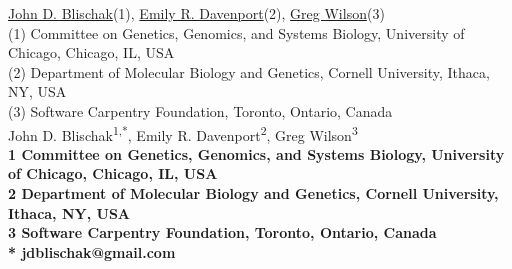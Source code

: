

\iflatexml
  \href{https://www.authorea.com/users/5990}{John D. Blischak}(1), \href{https://www.authorea.com/users/16152}{Emily R. Davenport}(2), \href{https://www.authorea.com/users/18131}{Greg Wilson}(3)\\

  (1) Committee on Genetics, Genomics, and Systems Biology, University of Chicago, Chicago, IL, USA\\
  (2) Department of Molecular Biology and Genetics, Cornell University, Ithaca, NY, USA\\
  (3) Software Carpentry Foundation, Toronto, Ontario, Canada
\else
  \\
  John D. Blischak\textsuperscript{1,*},
  Emily R. Davenport\textsuperscript{2},
  Greg Wilson\textsuperscript{3}
  \\
  \bigskip
  \bf{1} Committee on Genetics, Genomics, and Systems Biology, University of Chicago, Chicago, IL, USA
  \\
  \bf{2} Department of Molecular Biology and Genetics, Cornell University, Ithaca, NY, USA
  \\
  \bf{3} Software Carpentry Foundation, Toronto, Ontario, Canada
  \\
  \bigskip
  * jdblischak@gmail.com
